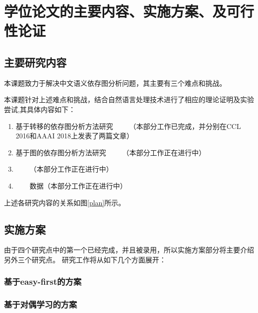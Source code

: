 
\section{学位论文的主要内容、实施方案、及可行性论证}

\subsection{主要研究内容}


本课题致力于解决中文语义依存图分析问题，其主要有三个难点和挑战。


本课题针对上述难点和挑战，结合自然语言处理技术进行了相应的理论证明及实验尝试,其具体内容如下：

\begin{enumerate}
	\item 基于转移的依存图分析方法研究
	\ \ \ \ 
	（本部分工作已完成，并分别在CCL 2016和AAAI 2018上发表了两篇文章）
	
	\item 基于图的依存图分析方法研究
	\ \ \ \ 
	（本部分工作正在进行中）
	
	\item 
	\ \ \ \ 
	（本部分工作正在进行中）
	
	\item 
	\ \ \ \ 
	数据（本部分工作正在进行中）
\end{enumerate}

上述各研究内容的关系如图\ref{plan}所示。



\subsection{实施方案}
由于四个研究点中的第一个已经完成，并且被录用，所以实施方案部分将主要介绍另外三个研究点。
研究工作将从如下几个方面展开：
\subsubsection{基于easy-first的方案}


\subsubsection{基于对偶学习的方案}


